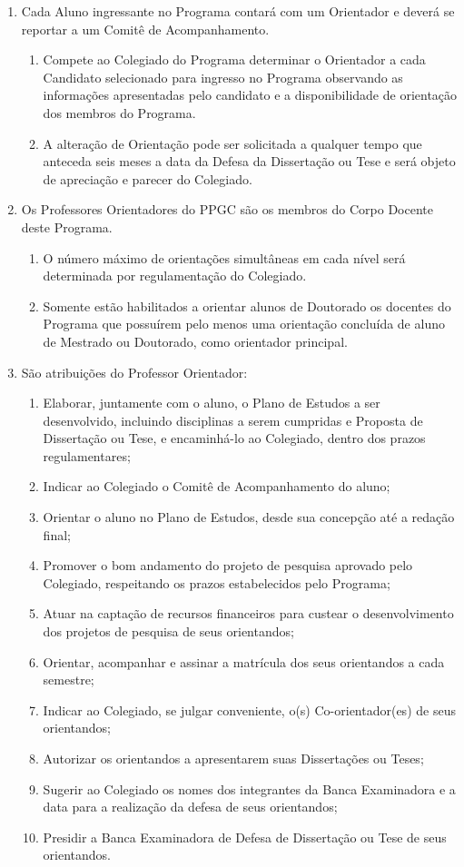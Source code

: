\documentclass{article}
\begin{document}
\begin{enumerate}
	\item Cada Aluno ingressante no Programa contará com um Orientador e deverá se reportar a um Comitê de Acompanhamento.
	\begin{enumerate}
		\item Compete ao Colegiado do Programa determinar o Orientador a cada Candidato selecionado para ingresso no Programa observando as informações apresentadas pelo candidato e a disponibilidade de orientação dos membros do Programa.
		\item A alteração de Orientação pode ser solicitada a qualquer tempo que anteceda seis meses a data da Defesa da Dissertação ou Tese e será objeto de apreciação e parecer do Colegiado.
	\end{enumerate}

	\item Os Professores Orientadores do PPGC são os membros do Corpo Docente deste Programa. 
	\begin{enumerate}
		\item O número máximo de orientações simultâneas em cada nível será determinada por regulamentação do Colegiado.
		\item Somente estão habilitados a orientar alunos de Doutorado os docentes do Programa que possuírem pelo menos uma orientação concluída de aluno de Mestrado ou Doutorado, como orientador principal.
	\end{enumerate}

	\item  São atribuições do Professor Orientador:
	\begin{enumerate}[label=\Roman*]
		\item Elaborar, juntamente com o aluno, o Plano de Estudos a ser desenvolvido, incluindo disciplinas a serem cumpridas e Proposta de Dissertação ou Tese, e encaminhá-lo ao Colegiado, dentro dos prazos regulamentares;
		\item	Indicar ao Colegiado o Comitê de Acompanhamento do aluno;
		\item	Orientar o aluno no Plano de Estudos, desde sua concepção até a redação final;
		\item	Promover o bom andamento do projeto de pesquisa aprovado pelo Colegiado, respeitando os prazos estabelecidos pelo Programa;
		\item	Atuar na captação de recursos financeiros para custear o desenvolvimento dos projetos de pesquisa de seus orientandos;
		\item	Orientar, acompanhar e assinar a matrícula dos seus orientandos a cada semestre;
		\item	Indicar ao Colegiado, se julgar conveniente, o(s) Co-orientador(es) de seus orientandos;
		\item	Autorizar os orientandos a apresentarem suas Dissertações ou Teses;
		\item	Sugerir ao Colegiado os nomes dos integrantes da Banca Examinadora e a data para a realização da defesa de seus orientandos;
		\item	Presidir a Banca Examinadora de Defesa de Dissertação ou Tese de seus orientandos.
	\end{enumerate}


\end{enumerate}
\end{document}
